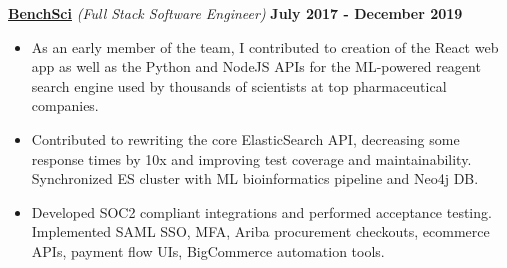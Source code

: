 \documentclass{article}
\begin{document}
{\bf{\underline{BenchSci}} } \textit{(Full Stack Software Engineer)} \hfill {\bf July 2017 - December 2019 \/}
\begin{itemize}[leftmargin=*]
    \itemsep0em
    \renewcommand\labelitemi{\tiny$\bullet$}
    \item As an early member of the team, I contributed to creation of the React web app as well as the Python and NodeJS APIs for the ML-powered reagent search engine used by thousands of scientists at top pharmaceutical companies.
    \item Contributed to rewriting the core ElasticSearch API, decreasing some response times by 10x and improving test coverage and  maintainability. Synchronized ES cluster with ML bioinformatics pipeline and Neo4j DB.
    \item Developed SOC2 compliant integrations and performed acceptance testing. Implemented SAML SSO, MFA, Ariba procurement checkouts, ecommerce APIs, payment flow UIs, BigCommerce automation tools.

\end{itemize}



\end{document}
